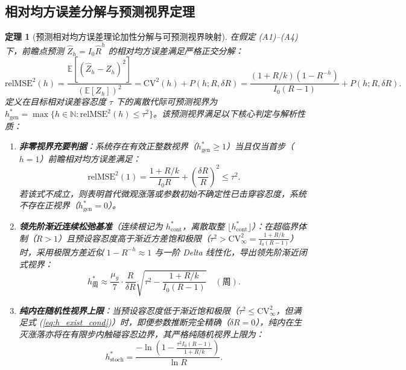 \documentclass[11pt,a4paper]{article}
\theoremstyle{plain}
\newtheorem{theorem}{定理}
\theoremstyle{definition}
\begin{document}
\subsection{相对均方误差分解与预测视界定理}

\begin{theorem}[预测相对均方误差理论加性分解与可预测视界映射]\label{thm:horizon}
在假定 (A1)--(A4) 下，前瞻点预测 $\hat{Z}_h = I_0 \hat{R}^h$ 的相对均方误差满足严格正交分解：
\begin{equation}
\text{relMSE}^2(h) = \frac{\mathbb{E}[(\hat{Z}_h - Z_h)^2]}{(\mathbb{E}[Z_h])^2} = \text{CV}^2(h) + P(h; R, \delta R) = \frac{(1+R/k)(1-R^{-h})}{I_0(R-1)} + P(h; R, \delta R).
\label{eq:relmse_decomp}
\end{equation}
定义在目标相对误差容忍度 $\tau$ 下的离散代际可预测视界为 $h^*_{\text{gen}} = \max \{ h \in \mathbb{N} : \text{relMSE}^2(h) \le \tau^2 \}$。该预测视界满足以下核心判定与解析性质：
\begin{enumerate}
\item \textbf{非零视界充要判据}：系统存在有效正整数视界（$h^*_{\text{gen}} \ge 1$）当且仅当首步（$h=1$）前瞻相对均方误差满足：
\begin{equation}
\text{relMSE}^2(1) = \frac{1+R/k}{I_0 R} + \left(\frac{\delta R}{R}\right)^2 \le \tau^2.
\label{eq:h_exist_cond}
\end{equation}
若该式不成立，则表明首代微观涨落或参数初始不确定性已击穿容忍度，系统不存在正视界（$h^*_{\text{gen}} = 0$）。
\item \textbf{领先阶渐近连续松弛基准}（连续根记为 $h^*_{\text{cont}}$，离散取整 $\lfloor h^*_{\text{cont}} \rfloor$）：在超临界体制（$R > 1$）且预设容忍度高于渐近方差饱和极限（$\tau^2 > \text{CV}^2_\infty = \frac{1+R/k}{I_0(R-1)}$）时，采用极限方差近似 $1-R^{-h} \approx 1$ 与一阶 Delta 线性化，导出领先阶渐近闭式视界：
\begin{equation}
h^*_{\text{周}} \approx \frac{\mu_g}{7} \cdot \frac{R}{\delta R} \sqrt{\tau^2 - \frac{1+R/k}{I_0(R-1)}} \quad (\text{周}).
\label{eq:horizon_cn}
\end{equation}
\item \textbf{纯内在随机性视界上限}：当预设容忍度低于渐近饱和极限（$\tau^2 \le \text{CV}^2_\infty$，但满足式 (\ref{eq:h_exist_cond})）时，即便参数推断完全精确（$\delta R = 0$），纯内在生灭涨落亦将在有限步内触碰容忍边界，其严格纯随机视界上限为：
\begin{equation}
h^*_{\text{stoch}} = \frac{-\ln\left(1 - \frac{\tau^2 I_0(R-1)}{1+R/k}\right)}{\ln R}.
\label{eq:h_stoch_bound}
\end{equation}

\end{enumerate}
\end{theorem}
\end{document}
